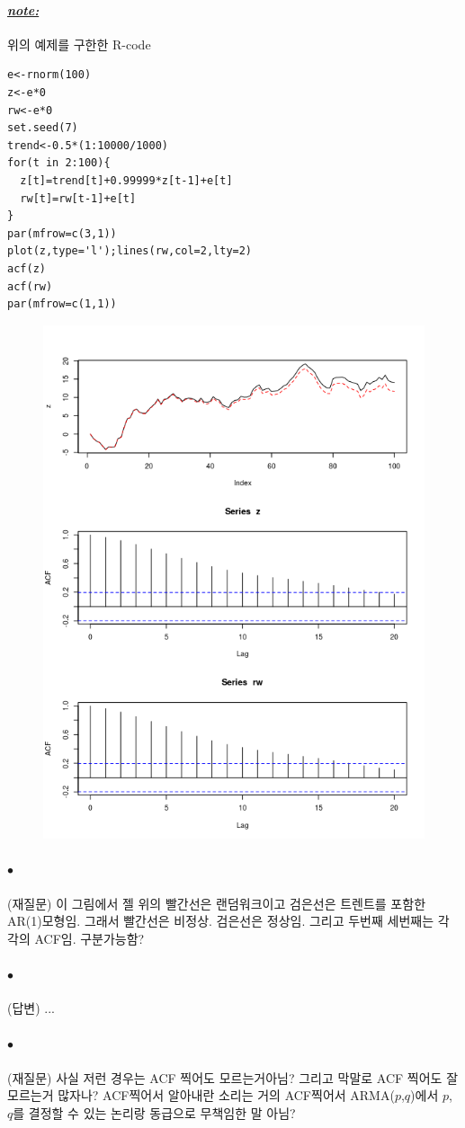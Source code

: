 \documentclass[12pt,oneside,english]{book}
\def\ck{\paragraph{\Large$\bullet$}\Large}
\def\note{\paragraph{\Large\textit{\underline{note:}}}\Large}
\begin{document}
\note 위의 예제를 구한한 R-code
\begin{lstlisting}
e<-rnorm(100)
z<-e*0
rw<-e*0
set.seed(7)
trend<-0.5*(1:10000/1000)
for(t in 2:100){
  z[t]=trend[t]+0.99999*z[t-1]+e[t]
  rw[t]=rw[t-1]+e[t]
}
par(mfrow=c(3,1))
plot(z,type='l');lines(rw,col=2,lty=2)
acf(z)
acf(rw)
par(mfrow=c(1,1))
\end{lstlisting}

\begin{figure}[h]
\includegraphics[width=1\textwidth]{fig1.png}
\end{figure}

\ck (재질문) 이 그림에서 젤 위의 빨간선은 랜덤워크이고 검은선은 트렌트를 포함한 AR(1)모형임. 그래서 빨간선은 비정상. 검은선은 정상임. 그리고 두번째 세번째는 각각의 ACF임. 구분가능함? 

\ck (답변) ... 


\ck (재질문) 사실 저런 경우는 ACF 찍어도 모르는거아님? 그리고 막말로 ACF 찍어도 잘 모르는거 많자나? ACF찍어서 알아내란 소리는 거의 ACF찍어서 ARMA($p$,$q$)에서 $p$, $q$를 결정할 수 있는 논리랑 동급으로 무책임한 말 아님? 
\end{document}
